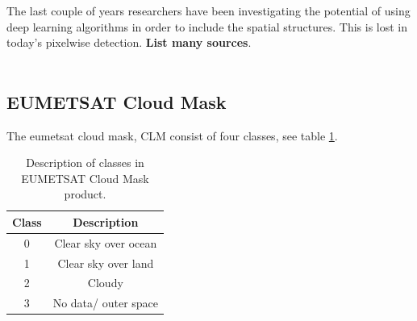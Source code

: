 The last couple of years researchers have been investigating the potential of using deep learning algorithms in order to include the spatial structures. This is lost in today's pixelwise detection. \textbf{List many sources}.
\\ \\
\subsection{EUMETSAT Cloud Mask} \label{sec:EUMETSAT_cloud_mask}
The \acrshort{eumetsat} cloud mask, CLM consist of four classes, see table \ref{tab:classes_clm}.

\begin{table}[]
    \centering
    \begin{tabular}{c|c}
        Class & Description \\ \hline
        0 & Clear sky over ocean \\
        1 & Clear sky over land \\
        2 & Cloudy \\
        3 & No data/ outer space        
    \end{tabular}
    \caption{Description of classes in EUMETSAT Cloud Mask product.}
    \label{tab:classes_clm}
\end{table}

